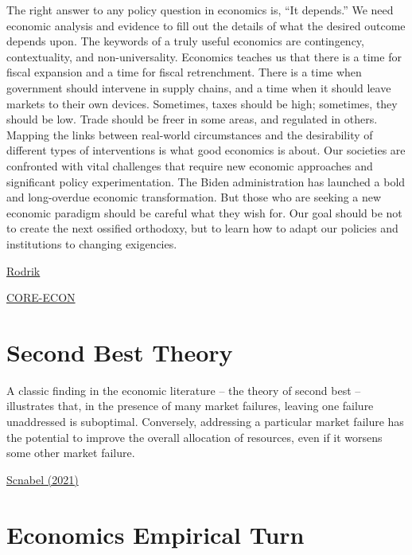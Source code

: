 \documentclass[
]{book}
\begin{document}
The right answer to any policy question in economics is, ``It depends.'' We need economic analysis and evidence to fill out the details of what the desired outcome depends upon. The keywords of a truly useful economics are contingency, contextuality, and non-universality. Economics teaches us that there is a time for fiscal expansion and a time for fiscal retrenchment. There is a time when government should intervene in supply chains, and a time when it should leave markets to their own devices. Sometimes, taxes should be high; sometimes, they should be low. Trade should be freer in some areas, and regulated in others. Mapping the links between real-world circumstances and the desirability of different types of interventions is what good economics is about. Our societies are confronted with vital challenges that require new economic approaches and significant policy experimentation. The Biden administration has launched a bold and long-overdue economic transformation. But those who are seeking a new economic paradigm should be careful what they wish for. Our goal should be not to create the next ossified orthodoxy, but to learn how to adapt our policies and institutions to changing exigencies.

\href{https://www.project-syndicate.org/commentary/economic-policy-must-abandon-universal-paradigms-by-dani-rodrik-2021-05}{Rodrik}

\href{https://www.core-econ.org/}{CORE-ECON}

\hypertarget{second-best-theory}{%
\section{Second Best Theory}\label{second-best-theory}}

A classic finding in the economic literature -- the theory of second best -- illustrates that, in the presence of many market failures, leaving one failure unaddressed is suboptimal. Conversely, addressing a particular market failure has the potential to improve the overall allocation of resources, even if it worsens some other market failure.

\href{https://www.ecb.europa.eu/press/key/date/2021/html/ecb.sp210614~162bd7c253.en.html}{Scnabel (2021)}

\hypertarget{economics-empirical-turn}{%
\section{Economics Empirical Turn}\label{economics-empirical-turn}}
\end{document}
